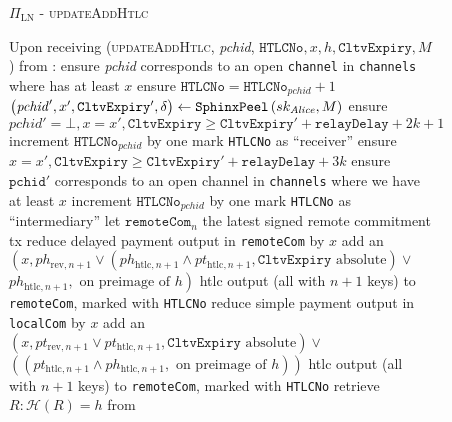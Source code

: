   \begin{figure}[H]
    \begin{protocolbox}{$\Pi_{\mathrm{LN}}$ - \textsc{updateAddHtlc}}
      \begin{algorithmic}[1]
        \State Upon receiving (\textsc{updateAddHtlc}, \textit{pchid},
        $\mathtt{HTLCNo}, x, h, \mathtt{CltvExpiry}, M$) from \bob:
        \Indent
          \State ensure \textit{pchid} corresponds to an open \texttt{channel}
          in \texttt{channels} where \bob{} has at least $x$
          \State ensure $\mathtt{HTLCNo} = \mathtt{HTLCNo}_{\mathit{pchid}} + 1$
          \State $\left(\mathit{pchid}', x', \mathtt{CltvExpiry}',
          \delta\right) \gets \mathtt{SphinxPeel}\left(sk_{\mathit{Alice}}, M\right)$
            \State ensure $\mathit{pchid}' = \bot, x = x', \mathtt{CltvExpiry}
            \geq \mathtt{CltvExpiry}' + \mathtt{relayDelay} + 2k + 1$
            \State increment $\mathtt{HTLCNo}_{\mathit{pchid}}$ by one
            \State mark \texttt{HTLCNo} as ``receiver''
          \Else {}
            \State ensure $x = x', \mathtt{CltvExpiry} \geq \mathtt{CltvExpiry}'
            + \mathtt{relayDelay} + 3k$
            \State ensure $\mathtt{pchid}'$ corresponds to an open channel in
            \texttt{channels} where we have at least $x$
            \State increment $\mathtt{HTLCNo}_{\mathit{pchid}}$ by one
            \State mark \texttt{HTLCNo} as ``intermediary''
          \EndIf
          \State let $\mathtt{remoteCom}_n$ the latest signed remote commitment
          tx
          \State reduce delayed payment output in \texttt{remoteCom} by $x$
          \State add an $\left(x, ph_{\mathrm{rev}, n+1} \vee
          \left(ph_{\mathrm{htlc}, n+1} \wedge pt_{\mathrm{htlc}, n+1},
          \mathtt{CltvExpiry} \text{ absolute}\right) \vee\right.$
          $\left.ph_{\mathrm{htlc}, n+1}, \text{ on preimage of } h\right)$ htlc
          output (all with $n+1$ keys) to \texttt{remoteCom}, marked with
          \texttt{HTLCNo}
          \State reduce simple payment output in \texttt{localCom} by $x$
          \State add an $\left(x, pt_{\mathrm{rev}, n+1} \vee pt_{\mathrm{htlc},
          n+1}, \mathtt{CltvExpiry} \text{ absolute}\right) \vee$
          $\left(\left(pt_{\mathrm{htlc}, n+1} \wedge ph_{\mathrm{htlc}, n+1},
          \text{ on preimage of } h\right)\right)$ htlc output (all with $n+1$
          keys) to \texttt{remoteCom}, marked with \texttt{HTLCNo}
            \State retrieve $R : \mathcal{H}\left(R\right) = h$ from

\end{algorithmic}
\end{protocolbox}
\end{figure}
